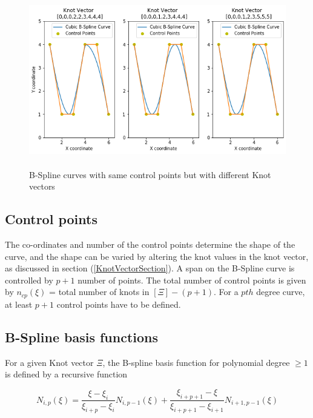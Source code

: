 \documentclass[11pt]{article}
\begin{document}
\begin{figure}[H]
	\begin{center}
		\includegraphics[scale=0.8]{DifferentKnotVector.png} 
		\caption{\\B-Spline curves with same control points but with different Knot vectors}\label{DifferentKnotVector}
	\end{center}	
\end{figure}

\subsection{Control points }
The co-ordinates and number of the control points determine the shape of the curve, and the shape can be varied by altering the knot values in the knot vector, as discussed in section (\ref{KnotVectorSection}). A span on the B-Spline curve is controlled by $p+1$ number of points. The total number of control points is given by $n_{cp}(\xi)$ = total number of knots in
$[\Xi] - (p+1)$. For a $pth$ degree curve, at least $p+1$ control points have to be defined. 


\subsection{B-Spline basis functions }

For a given Knot vector $\Xi$, the B-spline basis function for polynomial degree $\geq 1$ is defined by a recursive function \cite{piegl2012nurbs}

\begin{equation}
N_{i,p}(\xi) = \frac{\xi-\xi_{i}}{\xi_{i+p}-\xi_{i}} N_{i,p-1}(\xi) + 
\frac{\xi_{i+p+1}-\xi}{\xi_{i+p+1}-\xi_{i+1}} N_{i+1,p-1}(\xi)
\end{equation}
\end{document}
